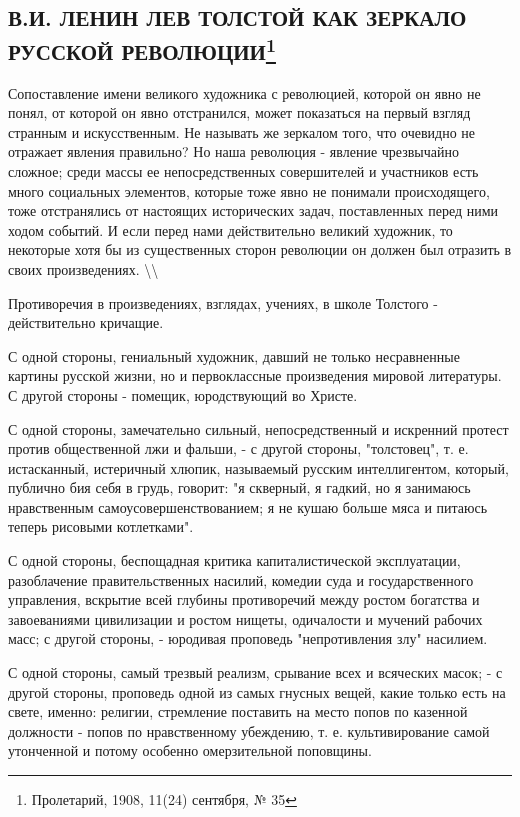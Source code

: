 \documentclass[12pt]{article}
\newcommand\ellipsis{%
  \textbackslash\thinspace\textellipsis\textbackslash
}
\newcommand{\parnum}{(\arabic{parcount})}
\newcounter{parcount}
\newenvironment{parnumbers}{%
  \par%
  \everypar{\noindent \stepcounter{parcount}\marginpar[]{\parnum}}%
}{}
\begin{document}
\subsection{В.И. ЛЕНИН ЛЕВ ТОЛСТОЙ КАК ЗЕРКАЛО РУССКОЙ РЕВОЛЮЦИИ\footnote{Пролетарий, 1908, 11(24) сентября, № 35}}
\begin{parnumbers}
Сопоставление имени великого художника с революцией, которой он явно не понял, от которой он явно отстранился, может показаться на первый взгляд странным и искусственным. Не называть же зеркалом того, что очевидно не отражает явления правильно? Но наша революция - явление чрезвычайно сложное; среди массы ее непосредственных совершителей и участников есть много социальных элементов, которые тоже явно не понимали происходящего, тоже отстранялись от настоящих исторических задач, поставленных перед ними ходом событий. И если перед нами действительно великий художник, то некоторые хотя бы из существенных сторон революции он должен был отразить в своих произведениях.\ellipsis

Противоречия в произведениях, взглядах, учениях, в школе Толстого - действительно кричащие.

С одной стороны, гениальный художник, давший не только несравненные картины русской жизни, но и первоклассные произведения мировой литературы. С другой стороны - помещик, юродствующий во Христе.

С одной стороны, замечательно сильный, непосредственный и искренний протест против общественной лжи и фальши, - с другой стороны, "толстовец", т. е. истасканный, истеричный хлюпик, называемый русским интеллигентом, который, публично бия себя в грудь, говорит: "я скверный, я гадкий, но я занимаюсь нравственным самоусовершенствованием; я не кушаю больше мяса и питаюсь теперь рисовыми котлетками".

С одной стороны, беспощадная критика капиталистической эксплуатации, разоблачение правительственных насилий, комедии суда и государственного управления, вскрытие всей глубины противоречий между ростом богатства и завоеваниями цивилизации и ростом нищеты, одичалости и мучений рабочих масс; с другой стороны, - юродивая проповедь "непротивления злу" насилием.

С одной стороны, самый трезвый реализм, срывание всех и всяческих масок; - с другой стороны, проповедь одной из самых гнусных вещей, какие только есть на свете, именно: религии, стремление поставить на место попов по казенной должности - попов по нравственному убеждению, т. е. культивирование самой утонченной и потому особенно омерзительной поповщины.
\end{parnumbers}
\end{document}
